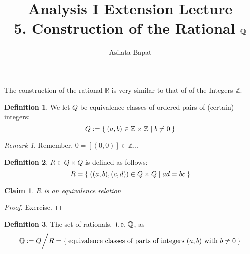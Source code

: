 \documentclass[12pt]{amsart}
\title[Construction of the Rational $\bbQ$]
	{Analysis I Extension Lecture\\5. Construction of the Rational $\bbQ$}
\author{Asilata Bapat}
\newcommand{\bbR}{\mathbb{R}}
\newcommand{\bbZ}{\mathbb{Z}}
\newcommand{\bbQ}{\mathbb{Q}}
\newcommand{\ie}{\operatorname{\thinspace i.e. \thinspace}}
\theoremstyle{plain}
\newtheorem*{claim}{Claim}
\theoremstyle{remark}
\newtheorem*{rmk}{Remark}
\theoremstyle{definition}
\newtheorem*{define}{Definition}
\begin{document}
\maketitle
{}

The construction of the rational $\bbR$ is very similar to that of of the Integers $\bbZ$.
\begin{define}
	We let $Q$ be equivalence classes of ordered pairs of (certain) integers:
	\begin{equation*}
		Q \vcentcolon = \Set{(a,b) \in \bbZ \times \bbZ | b \neq 0}
	\end{equation*}
\end{define}

\begin{rmk}
	Remember, $0 = [(0,0)] \in \bbZ\dots$
\end{rmk}

\begin{define}
	$R\in Q \times Q$ is defined as follows:
	\begin{equation*}
		R = \Set{((a,b), (c,d)) \in Q \times Q | ad = bc}
	\end{equation*}
\end{define}
\begin{claim}
	$R$ is an equivalence relation
\end{claim}
\begin{proof}
	Exercise.
\end{proof}

\begin{define}
	The set of rationals, $\ie \bbQ$, as 
	\begin{equation*}
		\bbQ \vcentcolon = Q\bigg/ R= \Set{\mbox{equivalence classes of parts of integers } (a,b) \mbox{ with } b \neq 0}
	\end{equation*}
\end{define}
\end{document}
